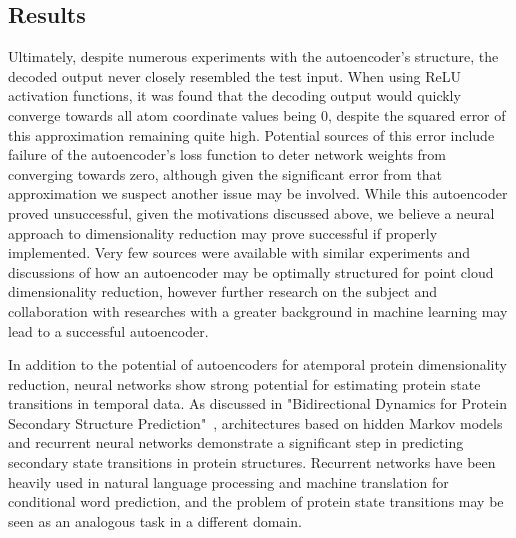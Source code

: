 \documentclass{article}
\begin{document}
\subsection{Results}
Ultimately, despite numerous experiments with the autoencoder's structure, the decoded output never closely resembled the test input. When using ReLU activation functions, it was found that the decoding output would quickly converge towards all atom coordinate values being 0, despite the squared error of this approximation remaining quite high. Potential sources of this error include failure of the autoencoder's loss function to deter network weights from converging towards zero, although given the significant error from that approximation we suspect another issue may be involved. While this autoencoder proved unsuccessful, given the motivations discussed above, we believe a neural approach to dimensionality reduction may prove successful if properly implemented. Very few sources were available with similar experiments and discussions of how an autoencoder may be optimally structured for point cloud dimensionality reduction, however further research on the subject and collaboration with researches with a greater background in machine learning may lead to a successful autoencoder.

In addition to the potential of autoencoders for atemporal protein dimensionality reduction, neural networks show strong potential for estimating protein state transitions in temporal data. As discussed in "Bidirectional Dynamics for Protein Secondary Structure Prediction"~\cite{recurrentnetworks}, architectures based on hidden Markov models and recurrent neural networks demonstrate a significant step in predicting secondary state transitions in protein structures. Recurrent networks have been heavily used in natural language processing and machine translation for conditional word prediction, and the problem of protein state transitions may be seen as an analogous task in a different domain.
\end{document}
